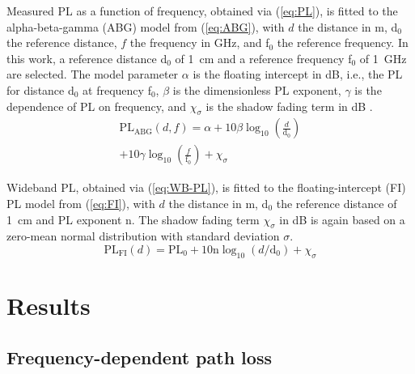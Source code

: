 \documentclass[preprint]{rsl}
\begin{document}
Measured PL as a function of frequency, obtained via (\ref{eq:PL}), is fitted to the alpha-beta-gamma (ABG) model from (\ref{eq:ABG}), with $d$ the distance in m, d$_0$ the reference distance, $f$ the frequency in GHz, and f$_0$ the reference frequency.  
In this work, a reference distance d$_0$ of 1~cm and a reference frequency f$_0$ of 1~GHz are selected.
The model parameter $\alpha$ is the floating intercept in dB, i.e., the PL for distance d$_0$ at frequency f$_0$, $\beta$ is the dimensionless PL exponent, $\gamma$ is the dependence of PL on frequency, and $\chi_{\sigma}$ is the shadow fading term in dB \cite{Salous2020}. 
\begin{multline}
  \text{PL}_{\text{ABG}}(d,f) = \alpha + 10 \beta \log_{10}\left(\frac{d}{\text{d}_0}\right) \\ + 10 \gamma \log_{10}\left(\frac{f}{ \text{f}_0}\right) + \chi_{\sigma}
  \label{eq:ABG}
\end{multline}

Wideband PL, obtained via (\ref{eq:WB-PL}), is fitted to the floating-intercept (FI) PL model from (\ref{eq:FI}), with $d$ the distance in m, d$_0$ the reference distance of 1~cm and PL exponent n. 
The shadow fading term $\chi_\sigma$ in dB is again based on a zero-mean normal distribution with standard deviation $\sigma$. 
\begin{equation}
  \text{PL}_{\text{FI}}(d) = \text{PL}_0 + 10 \text{n} \log_{10} (d/\text{d}_0) + \chi_\sigma
  \label{eq:FI}
\end{equation}

\section{Results\label{sect:results}}

\subsection{Frequency-dependent path loss}
\end{document}

